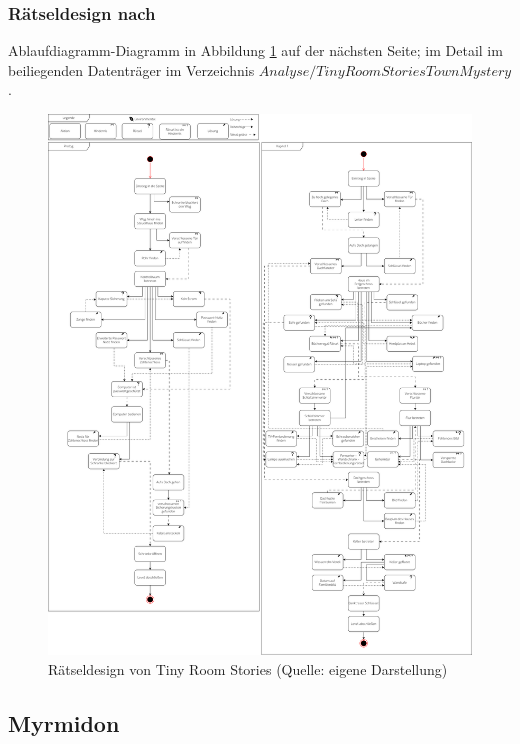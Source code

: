 \documentclass[
	12pt,
	a4paper,
	bibtotoc,
	cleardoubleempty, 
	idxtotoc,
	ngerman,
	openright
	final,
	listof=nochaptergap,
	]{scrbook}
\begin{document}
\begin{appendices}
\subsubsection{Rätseldesign nach \cite{tim_schafer_grim_1996}}\label{sec:append_riddles_trstm}
Ablaufdiagramm-Diagramm in Abbildung \ref{fig:trs-uml} auf der nächsten Seite; im Detail im beiliegenden Datenträger im Verzeichnis $Analyse/TinyRoomStoriesTownMystery$.

\newpage

\begin{figure}[ht]
\centering
\includegraphics[width=1\linewidth]{content/pictures/TinyRoomStoriesUML.png}
\caption{Rätseldesign von Tiny Room Stories (Quelle: eigene Darstellung)}
\label{fig:trs-uml}
\end{figure}

\clearpage

\subsection{Myrmidon}\label{sec:append_anylsis_m}


\end{appendices}
\end{document}

